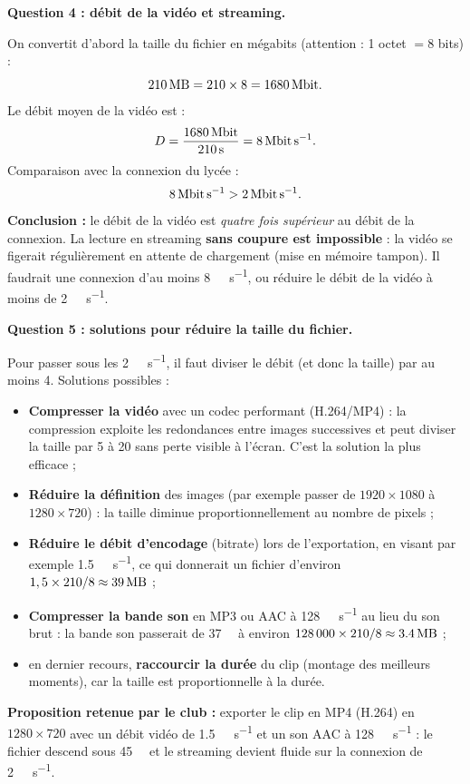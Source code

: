 \documentclass[11pt]{article}
\begin{document}
\begin{exoresolu}
\textbf{Question 4 : débit de la vidéo et streaming.}

On convertit d'abord la taille du fichier en mégabits (attention : 1 octet $= 8$ bits) :
\[
\SI{210}{\mega\byte} = 210 \times 8 = \SI{1680}{\mega\bit}.
\]
Le débit moyen de la vidéo est :
\[
D = \frac{\SI{1680}{\mega\bit}}{\SI{210}{\second}} = \SI{8}{\mega\bit\per\second}.
\]
Comparaison avec la connexion du lycée :
\[
\SI{8}{\mega\bit\per\second} > \SI{2}{\mega\bit\per\second}.
\]
\textbf{Conclusion :} le débit de la vidéo est \emph{quatre fois supérieur} au débit de la connexion. La lecture en streaming \textbf{sans coupure est impossible} : la vidéo se figerait régulièrement en attente de chargement (mise en mémoire tampon). Il faudrait une connexion d'au moins \SI{8}{\mega\bit\per\second}, ou réduire le débit de la vidéo à moins de \SI{2}{\mega\bit\per\second}.

\textbf{Question 5 : solutions pour réduire la taille du fichier.}

Pour passer sous les \SI{2}{\mega\bit\per\second}, il faut diviser le débit (et donc la taille) par au moins 4. Solutions possibles :
\begin{itemize}
\item \textbf{Compresser la vidéo} avec un codec performant (H.264/MP4) : la compression exploite les redondances entre images successives et peut diviser la taille par 5 à 20 sans perte visible à l'écran. C'est la solution la plus efficace ;
\item \textbf{Réduire la définition} des images (par exemple passer de $1920 \times 1080$ à $1280 \times 720$) : la taille diminue proportionnellement au nombre de pixels ;
\item \textbf{Réduire le débit d'encodage} (bitrate) lors de l'exportation, en visant par exemple \SI{1,5}{\mega\bit\per\second}, ce qui donnerait un fichier d'environ $1,5 \times 210 / 8 \approx \SI{39}{\mega\byte}$ ;
\item \textbf{Compresser la bande son} en MP3 ou AAC à \SI{128}{\kilo\bit\per\second} au lieu du son brut : la bande son passerait de \SI{37}{\mega\byte} à environ $128\,000 \times 210 / 8 \approx \SI{3,4}{\mega\byte}$ ;
\item en dernier recours, \textbf{raccourcir la durée} du clip (montage des meilleurs moments), car la taille est proportionnelle à la durée.
\end{itemize}
\textbf{Proposition retenue par le club :} exporter le clip en MP4 (H.264) en $1280 \times 720$ avec un débit vidéo de \SI{1,5}{\mega\bit\per\second} et un son AAC à \SI{128}{\kilo\bit\per\second} : le fichier descend sous \SI{45}{\mega\byte} et le streaming devient fluide sur la connexion de \SI{2}{\mega\bit\per\second}.
\end{exoresolu}
\end{document}
